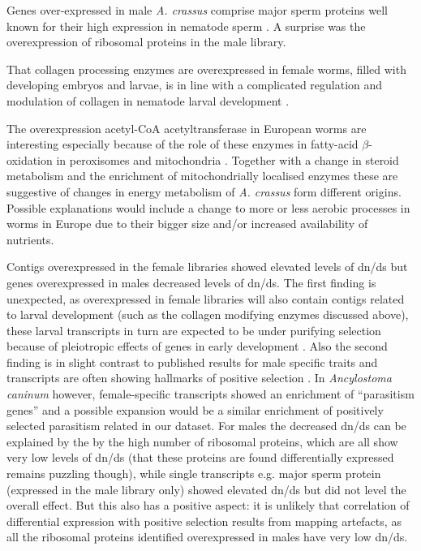 Genes over-expressed in male \textit{A. crassus} comprise major sperm
proteins well known for their high expression in nematode sperm
\cite{pmid15275275}. A surprise was the overexpression of ribosomal
proteins in the male library.

That collagen processing enzymes are overexpressed in female worms,
filled with developing embryos and larvae, is in line with a
complicated regulation and modulation of collagen in nematode larval
development \cite{pmid10637627}.

The overexpression acetyl-CoA acetyltransferase in European worms are
interesting especially because of the role of these enzymes in
fatty-acid $\beta$-oxidation in peroxisomes and mitochondria
\cite{pmid4721607}. Together with a change in steroid metabolism and
the enrichment of mitochondrially localised enzymes these are
suggestive of changes in energy metabolism of \textit{A. crassus} form
different origins. Possible explanations would include a change to
more or less aerobic processes in worms in Europe due to their bigger
size and/or increased availability of nutrients.

Contigs overexpressed in the female libraries showed elevated levels
of dn/ds but genes overexpressed in males decreased levels of
dn/ds. The first finding is unexpected, as overexpressed in female
libraries will also contain contigs related to larval development
(such as the collagen modifying enzymes discussed above), these larval
transcripts in turn are expected to be under purifying selection
because of pleiotropic effects of genes in early development
\cite{pmid15371532}. Also the second finding is in slight contrast to
published results for male specific traits and transcripts are often
showing hallmarks of positive selection
\cite{pmid15795858,pmid11404480}. In \textit{Ancylostoma caninum}
however, female-specific transcripts showed an enrichment of
``parasitism genes'' \cite{pmid20470405} and a possible expansion
would be a similar enrichment of positively selected parasitism
related in our dataset. For males the decreased dn/ds can be explained
by the by the high number of ribosomal proteins, which are all show
very low levels of dn/ds (that these proteins are found differentially
expressed remains puzzling though), while single transcripts
e.g. major sperm protein (expressed in the male library only) showed
elevated dn/ds but did not level the overall effect. But this also has
a positive aspect: it is unlikely that correlation of differential
expression with positive selection results from mapping artefacts, as
all the ribosomal proteins identified overexpressed in males have very
low dn/ds.

